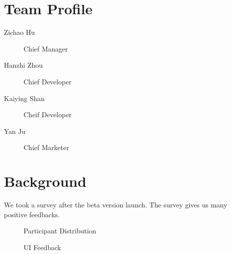 \documentclass[letterpaper,12pt]{article}
\begin{document}
\section{Team Profile}

\begin{description}
    \item[Zichao Hu] Chief Manager
    \item[Hanzhi Zhou] Chief Developer
    \item[Kaiying Shan] Cheif Developer
    \item[Yan Ju] Chief Marketer
\end{description}


\section{Background}
We took a survey after the beta version launch. The survey gives us many positive 
feedbacks. 
\begin{figure}
\caption{Participant Distribution}
\label{fig:Participant Distribution}
\end{figure}
    
\begin{figure}
\caption{UI Feedback}
\label{fig:UI Feedback}
\end{figure}
\end{document}
